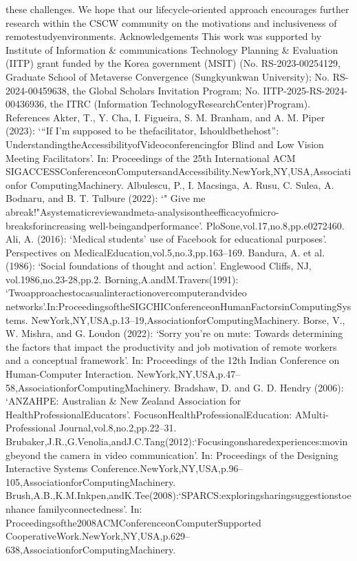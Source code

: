 \documentclass[12pt]{ctexart}
\begin{document}
these challenges. We hope that our lifecycle-oriented approach encourages further
research within the CSCW community on the motivations and inclusiveness of
remotestudyenvironments.
Acknowledgements
This work was supported by Institute of Information \& communications
Technology Planning \& Evaluation (IITP) grant funded by the Korea government
(MSIT) (No. RS-2023-00254129, Graduate School of Metaverse Convergence
(Sungkyunkwan University); No. RS-2024-00459638, the Global Scholars
Invitation Program; No. IITP-2025-RS-2024-00436936, the ITRC (Information
TechnologyResearchCenter)Program).
References
Akter, T., Y. Cha, I. Figueira, S. M. Branham, and A. M. Piper (2023): ‘“If I’m supposed to be
thefacilitator, Ishouldbethehost”: UnderstandingtheAccessibilityofVideoconferencingfor
Blind and Low Vision Meeting Facilitators’. In: Proceedings of the 25th International ACM
SIGACCESSConferenceonComputersandAccessibility.NewYork,NY,USA,Associationfor
ComputingMachinery.
Albulescu, P., I. Macsinga, A. Rusu, C. Sulea, A. Bodnaru, and B. T. Tulbure (2022): ‘" Give me
abreak!"Asystematicreviewandmeta-analysisontheefficacyofmicro-breaksforincreasing
well-beingandperformance’. PloSone,vol.17,no.8,pp.e0272460.
Ali, A. (2016): ‘Medical students’ use of Facebook for educational purposes’. Perspectives on
MedicalEducation,vol.5,no.3,pp.163–169.
Bandura, A. et al. (1986): ‘Social foundations of thought and action’. Englewood Cliffs, NJ,
vol.1986,no.23-28,pp.2.
Borning,A.andM.Travers(1991): ‘Twoapproachestocasualinteractionovercomputerandvideo
networks’.In:ProceedingsoftheSIGCHIConferenceonHumanFactorsinComputingSystems.
NewYork,NY,USA,p.13–19,AssociationforComputingMachinery.
Borse, V., W. Mishra, and G. Loudon (2022): ‘Sorry you’re on mute: Towards determining the
factors that impact the productivity and job motivation of remote workers and a conceptual
framework’. In: Proceedings of the 12th Indian Conference on Human-Computer Interaction.
NewYork,NY,USA,p.47–58,AssociationforComputingMachinery.
Bradshaw, D. and G. D. Hendry (2006): ‘ANZAHPE: Australian \& New Zealand Association for
HealthProfessionalEducators’. FocusonHealthProfessionalEducation: AMulti-Professional
Journal,vol.8,no.2,pp.22–31.
Brubaker,J.R.,G.Venolia,andJ.C.Tang(2012):‘Focusingonsharedexperiences:movingbeyond
the camera in video communication’. In: Proceedings of the Designing Interactive Systems
Conference.NewYork,NY,USA,p.96–105,AssociationforComputingMachinery.
Brush,A.B.,K.M.Inkpen,andK.Tee(2008):‘SPARCS:exploringsharingsuggestionstoenhance
familyconnectedness’. In: Proceedingsofthe2008ACMConferenceonComputerSupported
CooperativeWork.NewYork,NY,USA,p.629–638,AssociationforComputingMachinery.
\end{document}
